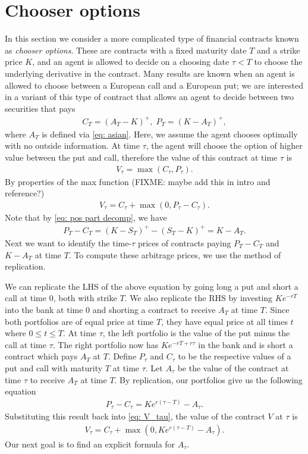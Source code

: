 \documentclass[reqno]{amsart}
\begin{document}
\section{Chooser options}
In this section we consider a more complicated type of financial contracts known as \emph{chooser options}. These are contracts with a fixed maturity date $T$ and a strike price $K$, and an agent is allowed to decide on a choosing date $\tau < T$ to choose the underlying derivative in the contract. Many results are known when an agent is allowed to choose between a European call and a European put; we are interested in a variant of this type of contract that allows an agent to decide between two securities that pays 
\begin{align}
     C_T = (A_T - K)^+, \; P_T = (K - A_T)^+,
\end{align}
where $A_T$ is defined via \eqref{eq: asian}.
Here, we assume the agent chooses optimally with no outside information. At time $\tau$, the agent will choose the option of higher value between the put and call, therefore the value of this contract at time $\tau$ is 
\begin{align}\label{eq: V_tau}
     V_\tau = \max(C_\tau, P_\tau).
\end{align}
By properties of the max function (FIXME: maybe add this in intro and reference?)
\begin{align}
     V_\tau = C_\tau + \max(0, P_\tau - C_\tau).
\end{align}
Note that by \eqref{eq: pos part decomp}, we have
\begin{align}
     P_T - C_T = (K-S_T)^+ - (S_T - K)^+ = K - A_T. 
\end{align}
Next we want to identify the time-$\tau$ prices of contracts paying $P_T - C_T$ and $K - A_T$ at time $T$. To compute these arbitrage prices, we use the method of replication.

We can replicate the LHS of the above equation by going long a put and short a call at time $0$, both with strike $T$. 
We also replicate the RHS by investing $Ke^{-rT}$ into the bank at time 0 and shorting a contract to receive $A_T$ at time $T$. 
Since both portfolios are of equal price at time $T$, they have equal price at all times $t$ where $0 \leq t \leq T$. 
At time $\tau$, the left portfolio is the value of the put minus the call at time $\tau$. 
The right portfolio now has $Ke^{-rT + r\tau}$ in the bank and is short a contract which pays $A_T$ at $T$.
Define $P_\tau$ and $C_\tau$ to be the respective values of a put and call with maturity $T$ at time $\tau$.
Let $A_\tau$ be the value of the contract at time $\tau$ to receive $A_T$ at time $T$.
By replication, our portfolios give us the following equation
\begin{align}
     P_\tau - C_\tau = Ke^{r(\tau - T)} - A_\tau.
\end{align}
Substituting this result back into \eqref{eq: V_tau}, the value of the contract $V$ at $\tau$ is
\begin{align}
     V_\tau = C_\tau + \max(0, Ke^{r(\tau - T)} - A_\tau).
\end{align}
Our next goal is to find an explicit formula for $A_\tau$. 
\end{document}
